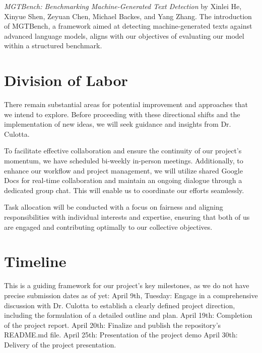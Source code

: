 \documentclass[11pt,a4paper]{article}
\begin{document}
\textit{MGTBench: Benchmarking Machine-Generated Text Detection} by Xinlei He, Xinyue Shen, Zeyuan Chen, Michael Backes, and Yang Zhang. The introduction of MGTBench, a framework aimed at detecting machine-generated texts against advanced language models, aligns with our objectives of evaluating our model within a structured benchmark.


\section{Division of Labor}
There remain substantial areas for potential improvement and approaches that we intend to explore. Before proceeding with these directional shifts and the implementation of new ideas, we will seek guidance and insights from Dr. Culotta. 

To facilitate effective collaboration and ensure the continuity of our project's momentum, we have scheduled bi-weekly in-person meetings. Additionally, to enhance our workflow and project management, we will utilize shared Google Docs for real-time collaboration and maintain an ongoing dialogue through a dedicated group chat. This will enable us to coordinate our efforts seamlessly. 

Task allocation will be conducted with a focus on fairness and aligning responsibilities with individual interests and expertise, ensuring that both of us are engaged and contributing optimally to our collective objectives. 

\section{Timeline}
This is a guiding framework for our project's key milestones, as we do not have  precise submission dates as of yet:  
April 9th, Tuesday: Engage in a comprehensive discussion with Dr. Culotta to establish a clearly defined project direction, including the formulation of a detailed outline and plan.  
April 19th: Completion of the project report.  
April 20th: Finalize and publish the repository's README.md file. 
April 25th: Presentation of the project demo 
April 30th: Delivery of the project presentation. 



\end{document}
